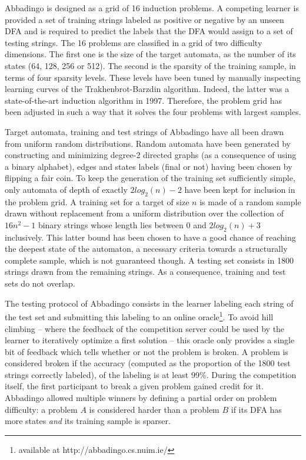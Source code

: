 Abbadingo is designed as a grid of 16 induction problems. A competing learner is provided a set of training strings labeled as positive or negative by an unseen DFA and is required to predict the labels that the DFA would assign to a set of testing strings. The 16 problems are classified in a grid of two difficulty dimensions. The first one is the size of the target automata, as the number of its states (64, 128, 256 or 512). The second is the sparsity of the training sample, in terms of four sparsity levels. These levels have been tuned by manually inspecting learning curves of the Trakhenbrot-Barzdin algorithm. Indeed, the latter was a state-of-the-art induction algorithm in 1997. Therefore, the problem grid has been adjusted in such a way that it solves the four problems with largest samples.

Target automata, training and test strings of Abbadingo have all been drawn from uniform random distributions. Random automata have been generated by constructing and minimizing degree-2 directed graphs (as a consequence of using a binary alphabet), edges and states labels (final or not) having been chosen by flipping a fair coin. To keep the generation of the training set sufficiently simple, only automata of depth of exactly $2log_2(n)-2$ have been kept for inclusion in the problem grid. A training set for a target of size $n$ is made of a random sample drawn without replacement from a uniform distribution over the collection of $16n^2 -1$ binary strings whose length lies between 0 and $2log_2(n)+3$ inclusively. This latter bound has been chosen to have a good chance of reaching the deepest state of the automaton, a necessary criteria towards a structurally complete sample, which is not guaranteed though. A testing set consists in 1800 strings drawn from the remaining strings. As a consequence, training and test sets do not overlap.

The testing protocol of Abbadingo consists in the learner labeling each string of the test set and submitting this labeling to an online oracle\footnote{available at http://abbadingo.cs.nuim.ie/}. To avoid hill climbing -- where the feedback of the competition server could be used by the learner to iteratively optimize a first solution -- this oracle only provides a single bit of feedback which tells whether or not the problem is broken. A problem is considered broken if the accuracy (computed as the proportion of the 1800 test strings correctly labeled), of the labeling is at least 99\%. During the competition itself, the first participant to break a given problem gained credit for it. Abbadingo allowed multiple winners by defining a partial order on problem difficulty: a problem $A$ is considered harder than a problem $B$ if its DFA has more states \emph{and} its training sample is sparser. 

